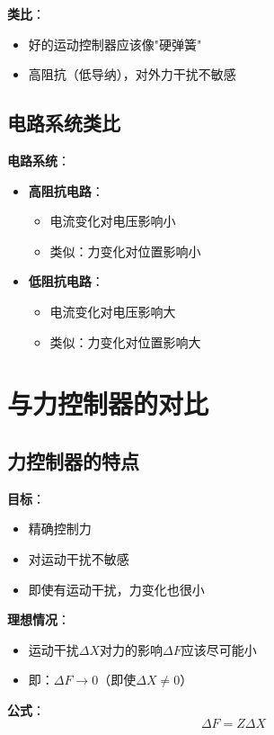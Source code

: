 \documentclass[12pt,a4paper]{article}
\begin{document}
\textbf{类比}：
\begin{itemize}
\item 好的运动控制器应该像"硬弹簧"
\item 高阻抗（低导纳），对外力干扰不敏感
\end{itemize}

\subsection{电路系统类比}

\textbf{电路系统}：
\begin{itemize}
\item \textbf{高阻抗电路}：
\begin{itemize}
\item 电流变化对电压影响小
\item 类似：力变化对位置影响小
\end{itemize}

\item \textbf{低阻抗电路}：
\begin{itemize}
\item 电流变化对电压影响大
\item 类似：力变化对位置影响大
\end{itemize}
\end{itemize}

\section{与力控制器的对比}

\subsection{力控制器的特点}

\textbf{目标}：
\begin{itemize}
\item 精确控制力
\item 对运动干扰不敏感
\item 即使有运动干扰，力变化也很小
\end{itemize}

\textbf{理想情况}：
\begin{itemize}
\item 运动干扰$\Delta X$对力的影响$\Delta F$应该尽可能小
\item 即：$\Delta F \to 0$（即使$\Delta X \neq 0$）
\end{itemize}

\textbf{公式}：
\begin{equation}
\Delta F = Z \Delta X
\end{equation}
\end{document}
